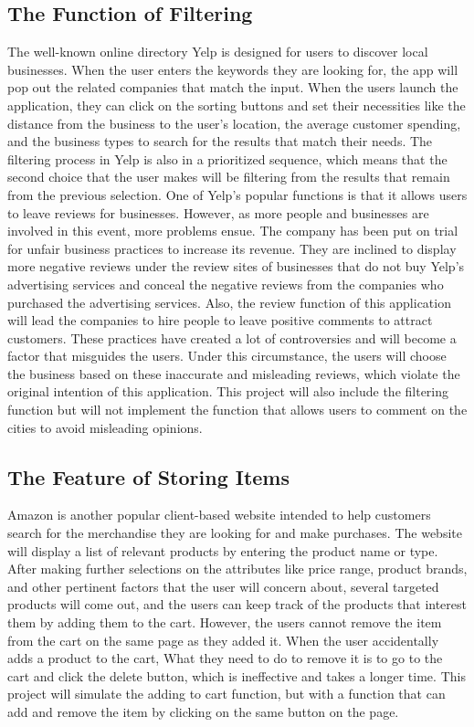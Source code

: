\documentclass[10pt,twocolumn]{article}
\begin{document}
\subsection{The Function of Filtering}
The well-known online directory Yelp is designed for users to discover local businesses. When the user enters the keywords they are looking for, the app will pop out the related companies that match the input. When the users launch the application, they can click on the sorting buttons and set their necessities like the distance from the business to the user's location, the average customer spending, and the business types to search for the results that match their needs. The filtering process in Yelp is also in a prioritized sequence, which means that the second choice that the user makes will be filtering from the results that remain from the previous selection.
\newline
\indent
One of Yelp's popular functions is that it allows users to leave reviews for businesses. However, as more people and businesses are involved in this event, more problems ensue. The company has been put on trial for unfair business practices to increase its revenue\cite{Luca2011}. They are inclined to display more negative reviews under the review sites of businesses that do not buy Yelp's advertising services and conceal the negative reviews from the companies who purchased the advertising services. Also, the review function of this application will lead the companies to hire people to leave positive comments to attract customers. These practices have created a lot of controversies and will become a factor that misguides the users. Under this circumstance, the users will choose the business based on these inaccurate and misleading reviews, which violate the original intention of this application. This project will also include the filtering function but will not implement the function that allows users to comment on the cities to avoid misleading opinions.

	
\subsection{The Feature of Storing Items}
Amazon is another popular client-based website intended to help customers search for the merchandise they are looking for and make purchases. The website will display a list of relevant products by entering the product name or type. After making further selections on the attributes like price range, product brands, and other pertinent factors that the user will concern about, several targeted products will come out, and the users can keep track of the products that interest them by adding them to the cart. However, the users cannot remove the item from the cart on the same page as they added it. When the user accidentally adds a product to the cart, What they need to do to remove it is to go to the cart and click the delete button, which is ineffective and takes a longer time. This project will simulate the adding to cart function, but with a function that can add and remove the item by clicking on the same button on the page. 
\end{document}

